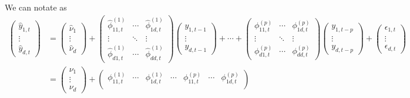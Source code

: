 \documentclass[fleqn]{article}
\begin{document}
We can notate as
\begin{align*}
    \begin{pmatrix}
        \hat{y}_{1, t} \\
        \vdots \\
        \hat{y}_{d, t}
    \end{pmatrix}
    &=
    \begin{pmatrix}
        \hat{\nu}_1 \\
        \vdots \\
        \hat{\nu}_d
    \end{pmatrix}
    +
    \begin{pmatrix}
        \hat{\phi}^{(1)}_{11, t} & \cdots & \hat{\phi}^{(1)}_{1d, t} \\
        \vdots & \ddots & \vdots \\
        \hat{\phi}^{(1)}_{d1, t} & \cdots & \hat{\phi}^{(1)}_{dd, t}
    \end{pmatrix}
    \begin{pmatrix}
        y_{1, t-1} \\
        \vdots \\
        y_{d, t-1}
    \end{pmatrix}
    + \cdots +
    \begin{pmatrix}
        \phi^{(p)}_{11, t} & \cdots & \phi^{(p)}_{1d, t} \\
        \vdots & \ddots & \vdots \\
        \phi^{(p)}_{d1, t} & \cdots & \phi^{(p)}_{dd, t}
    \end{pmatrix}
    \begin{pmatrix}
        y_{1, t-p} \\
        \vdots \\
        y_{d, t-p}
    \end{pmatrix}
    +
    \begin{pmatrix}
        \epsilon_{1, t} \\
        \vdots \\
        \epsilon_{d, t}
    \end{pmatrix} \\
    & =
    \begin{pmatrix}
        \nu_1 \\
        \vdots \\
        \nu_d
    \end{pmatrix}
    +
    \begin{pmatrix}
        \phi^{(1)}_{11, t} & \cdots & \phi^{(1)}_{1d, t}
        & \cdots &
        \phi^{(p)}_{11, t} & \cdots & \phi^{(p)}_{1d, t} \\

\end{pmatrix}
\end{align*}
\end{document}
